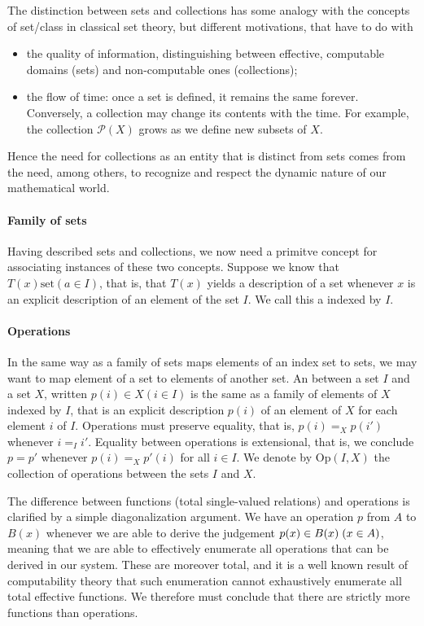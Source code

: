 The distinction between sets and collections has some analogy with the concepts
of set/class in classical set theory, but different motivations, that have to do
with

\begin{itemize}
\item the quality of information, distinguishing between effective, computable
  domains (sets) and non-computable ones (collections);
\item the flow of time: once a set is defined, it remains the same
  forever. Conversely, a collection may change its contents with the time. For
  example, the collection $\mathcal{P}(X)$ grows as we define new subsets of
  $X$.
\end{itemize}

Hence the need for collections as an entity that is distinct from sets comes
from the need, among others, to recognize and respect the dynamic nature of our
mathematical world.

\paragraph{Family of sets}

Having described sets and collections, we now need a primitve concept for
associating instances of these two concepts. Suppose we know that $T(x)
\text{set} (a \in I)$, that is, that $T(x)$ yields a description of a set
whenever $x$ is an explicit description of an element of the set $I$. We call
this a  indexed by $I$.

\paragraph{Operations}

In the same way as a family of sets maps elements of an index set to sets, we
may want to map element of a set to elements of another set. An
 between a set $I$ and a set $X$, written
$p(i) \in X (i \in I)$ is the same as a family of elements of $X$ indexed by
$I$, that is an explicit description $p(i)$ of an element of $X$ for each
element $i$ of $I$. Operations must preserve equality, that is, $p(i) =_X p(i')$
whenever $i =_I i'$.
Equality between operations is extensional, that is, we conclude $p = p'$
whenever $p(i) =_X p'(i)$ for all $i \in I$.
We denote by $\mathrm{Op}(I,X)$ the collection of operations between the sets
$I$ and $X$.

The difference between functions (total single-valued relations) and operations
is clarified by a simple diagonalization argument. We have an operation $p$
from $A$ to $B(x)$ whenever we are able to derive the judgement
$p(x) \in B(x) \; (x \in A)$, meaning that we are able to effectively enumerate
all operations that can be derived in our system. These are moreover total, and
it is a well known result of computability theory that such enumeration cannot
exhaustively enumerate all total effective functions. We therefore must conclude
that there are strictly more functions than operations.

